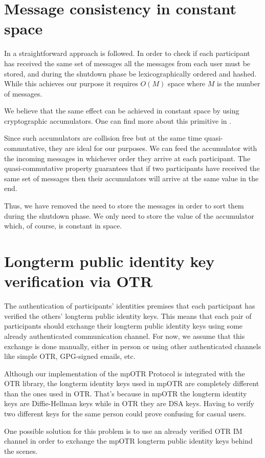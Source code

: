 \section{Message consistency in constant space}
In \cite{mpotr} a straightforward approach is followed. In order to check if
each participant has received the same set of messages all the messages from
each user must be stored, and during the shutdown phase be lexicographically
ordered and hashed. While this achieves our purpose it requires $O(M)$ space
where $M$ is the number of messages.

We believe that the same effect can be achieved in constant space by using
cryptographic accumulators. One can find more about this primitive in \cite{accum_def}.

Since such accumulators are collision free but at the same time quasi-commutative,
they are ideal for our purposes. We can feed the accumulator with the incoming
messages in whichever order they arrive at each participant. The quasi-commutative
property guarantees that if two participants have received the same set of messages
then their accumulators will arrive at the same value in the end.

Thus, we have removed the need to store the messages in order to sort them during
the shutdown phase. We only need to store the value of the accumulator which,
of course, is constant in space.

\section{Longterm public identity key verification via OTR}
The authentication of participants' identities premises that each participant has verified the others' longterm public identity keys. This means that each pair of participants should exchange their longterm public identity keys using some already authenticated communication channel. For now, we assume that this exchange is done manually, either in person or using other authenticated channels like simple OTR, GPG-signed emails, etc.

Although our implementation of the mpOTR Protocol is integrated with the OTR library, the longterm identity keys used in mpOTR are completely different than the ones used in OTR. That's because in mpOTR the longterm identity keys are Diffie-Hellman keys while in OTR they are DSA keys. Having to verify two different keys for the same person could prove confusing for casual users.

One possible solution for this problem is to use an already verified OTR IM channel in order to exchange the mpOTR longterm public identity keys behind the scenes.

